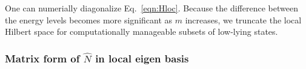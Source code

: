 \documentclass{article}[12pt]
\numberwithin{equation}{section}
\begin{document}
\begin{spacing}{1.5}
One can numerially diagonalize Eq.~\ref{eqn:Hloc}.
Because the difference between the energy levels becomes more significant as $m$ increases, we truncate the local Hilbert space for computationally manageable subsets of low-lying states.

\subsubsection*{Matrix form of $\hat{N}$ in local eigen basis}

\end{spacing}
\end{document}
